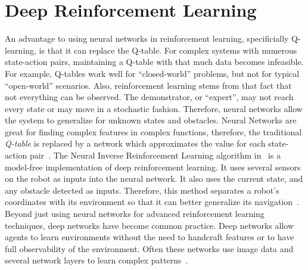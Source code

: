 \documentclass[12pt,american]{report}
\begin{document}
\section{Deep Reinforcement Learning}
An advantage to using neural networks in reinforcement learning, specificially Q-learning, is that it can replace the Q-table. For complex systems with numerous state-action pairs, maintaining a Q-table with that much data becomes infeasible. For example, Q-tables work well for ``closed-world'' problems, but not for typical ``open-world'' scenarios. Also, reinforcement learning stems from that fact that not everything can be observed. The demonstrator, or ``expert'', may not reach every state or may move in a stochastic fashion. Therefore, neural networks allow the system to generalize for unknown states and obstacles. Neural Networks are great for finding complex features in complex functions, therefore, the traditional \textit{Q-table} is replaced by a network which approximates the value for each state-action pair~\cite{matiisen_2015}. The Neural Inverse Reinforcement Learning algorithm in~\cite{xia2016neural} is a model-free implementation of deep reinforcement learning. It uses several sensors on the robot as inputs into the neural network.  It also uses the current state, and any obstacle detected as inputs. Therefore, this method separates a robot's coordinates with its environment so that it can better generalize its navigation~\cite{xia2016neural}. Beyond just using neural networks for advanced reinforcement learning techniques, deep networks have become common practice. Deep networks allow agents to learn environments without the need to handcraft features or to have full observability of the environment. Often these networks use image data and several network layers to learn complex patterns~\cite{atari}.
	
\end{document}
